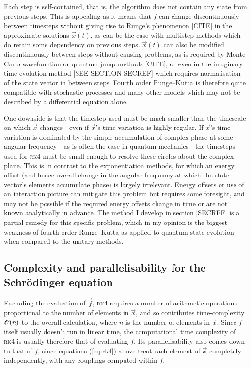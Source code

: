 Each step is self-contained, that is, the algorithm does not contain any state from previous steps. This is appealing as it means that $f$ can change discontinuously between timesteps without giving rise to Runge's phenomenon [CITE] in the approximate solutions $\vec x(t)$, as can be the case with multistep methods which do retain some dependency on previous steps.
$\vec x(t)$ can also be modified discontinuously between steps without causing problems, as is required by Monte-Carlo wavefunction or quantum jump methods [CITE], or even in the imaginary time evolution method [SEE SECTION SECREF] which requires normalisation of the state vector in between steps. Fourth order Runge--Kutta is therefore quite compatible with stochastic processes and many other models which may not be described by a differential equation alone.

One downside is that the timestep used must be much smaller than the timescale on which $\vec x$ changes - even if $\vec x$'s time variation is highly regular. If $\vec x$'s time variation is dominated by the simple accumulation of complex phase at some angular frequency---as is often the case in quantum mechanics---the timesteps used for \textsc{rk4} must be small enough to resolve these circles about the complex plane. This is in contrast to the exponentiation methods, for which an energy offset (and hence overall change in the angular frequency at which the state vector's elements accumulate phase) is largely irrelevant. Energy offsets or use of an interaction picture can mitigate this problem but requires some foresight, and may not be possible if the required energy offsets change in time or are not known analytically in advance. The method I develop in section [SECREF] is a partial remedy for this specific problem, which in my opinion is the biggest weakness of fourth order Runge--Kutta as applied to quantum state evolution, when compared to the unitary methods.

\subsection{Complexity and parallelisability for the Schr\"odinger equation}

Excluding the evaluation of $\vec f$, \textsc{rk4} requires a number of arithmetic operations proportional to the number of elements in $\vec x$, and so contributes time-complexity $\mathscr{O}(n)$ to the overall calculation, where $n$ is the number of elements in $\vec x$. Since $f$ itself usually doesn't run in linear time, the computational time complexity of \textsc{rk4} is usually therefore that of evaluating $f$. Its parallelisability also comes down to that of $f$, since equations (\ref{eq:rk4}) above treat each element of $\vec x$ completely independently, with any couplings computed within $f$.

